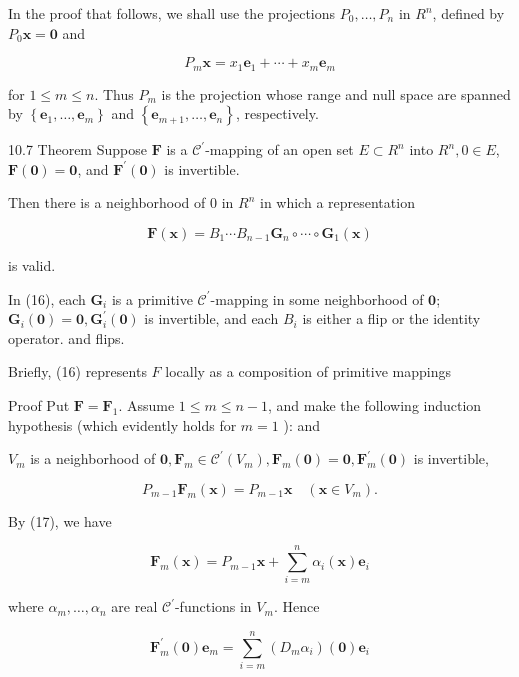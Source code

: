 \documentclass[10pt]{article}
\begin{document}
In the proof that follows, we shall use the projections $P_{0}, \ldots, P_{n}$ in $R^{n}$, defined by $P_{0} \mathbf{x}=\mathbf{0}$ and

$$
P_{m} \mathbf{x}=x_{1} \mathbf{e}_{1}+\cdots+x_{m} \mathbf{e}_{m}
$$

for $1 \leq m \leq n$. Thus $P_{m}$ is the projection whose range and null space are spanned by $\left\{\mathbf{e}_{1}, \ldots, \mathbf{e}_{m}\right\}$ and $\left\{\mathbf{e}_{m+1}, \ldots, \mathbf{e}_{n}\right\}$, respectively.

10.7 Theorem Suppose $\mathbf{F}$ is a $\mathscr{C}^{\prime}$-mapping of an open set $E \subset R^{n}$ into $R^{n}, 0 \in E$, $\mathbf{F}(\mathbf{0})=\mathbf{0}$, and $\mathbf{F}^{\prime}(\mathbf{0})$ is invertible.

Then there is a neighborhood of 0 in $R^{n}$ in which a representation

$$
\mathbf{F}(\mathbf{x})=B_{1} \cdots B_{n-1} \mathbf{G}_{n} \circ \cdots \circ \mathbf{G}_{1}(\mathbf{x})
$$

is valid.

In (16), each $\mathbf{G}_{i}$ is a primitive $\mathscr{C}^{\prime}$-mapping in some neighborhood of $\mathbf{0}$; $\mathbf{G}_{i}(\mathbf{0})=\mathbf{0}, \mathbf{G}_{i}^{\prime}(\mathbf{0})$ is invertible, and each $B_{i}$ is either a flip or the identity operator. and flips.

Briefly, (16) represents $F$ locally as a composition of primitive mappings

Proof Put $\mathbf{F}=\mathbf{F}_{1}$. Assume $1 \leq m \leq n-1$, and make the following induction hypothesis (which evidently holds for $m=1$ ): and

$V_{m}$ is a neighborhood of $\mathbf{0}, \mathbf{F}_{m} \in \mathscr{C}^{\prime}\left(V_{m}\right), \mathbf{F}_{m}(\mathbf{0})=\mathbf{0}, \mathbf{F}_{m}^{\prime}(\mathbf{0})$ is invertible,

$$
P_{m-1} \mathbf{F}_{m}(\mathbf{x})=P_{m-1} \mathbf{x} \quad\left(\mathbf{x} \in V_{m}\right) .
$$

By (17), we have

$$
\mathbf{F}_{m}(\mathbf{x})=P_{m-1} \mathbf{x}+\sum_{i=m}^{n} \alpha_{i}(\mathbf{x}) \mathbf{e}_{i}
$$

where $\alpha_{m}, \ldots, \alpha_{n}$ are real $\mathscr{C}^{\prime}$-functions in $V_{m}$. Hence

$$
\mathbf{F}_{m}^{\prime}(\mathbf{0}) \mathbf{e}_{m}=\sum_{i=m}^{n}\left(D_{m} \alpha_{i}\right)(\mathbf{0}) \mathbf{e}_{i}
$$
\end{document}
